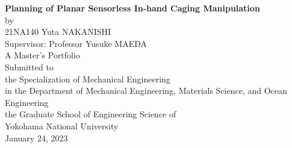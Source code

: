 \documentclass[a4paper,twoside,12pt,papersize, dvipdfmx]{iirthesis}
\begin{document}
 \pagestyle{empty}		%

%


\pagestyle{empty}
\cleardoublepage
\begin{center}
    \vspace{12em}
    \Large
{\sffamily \bfseries \huge{Planning of Planar Sensorless In-hand Caging Manipulation}}\\
    \vspace{2em}
    {\LARGE by}\\
    \vspace{2em}
    {\LARGE 21NA140 Yuta NAKANISHI}\\
    \vspace{9em}
    Supervisor: Professor Yusuke MAEDA\\
    \vspace{2em}
    A Master's Portfolio\\
    Submitted to\\
    the Specialization of Mechanical Engineering\\
    in the Department of Mechanical Engineering, Materials Science, and Ocean Engineering\\
    the Graduate School of Engineering Science of\\
    Yokohama National University\\
    \vspace{3em}
    January 24, 2023
\end{center}
\end{document}
